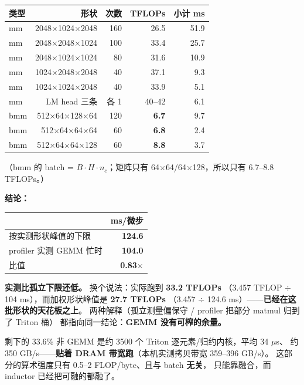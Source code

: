 \documentclass[11pt,openany]{ctexart}
\begin{document}
\begin{center}
\small
{}
\begin{tabular}{lrrrr}
\toprule
\textbf{类型} & \textbf{形状} & \textbf{次数} & \textbf{TFLOPs} & \textbf{小计 ms} \\
\midrule
mm & 2048$\times$1024$\times$2048 & 160 & 26.5 & 51.9 \\
mm & 2048$\times$2048$\times$1024 & 100 & 33.4 & 25.7 \\
mm & 2048$\times$1024$\times$1024 & 80 & 31.6 & 10.9 \\
mm & 1024$\times$2048$\times$2048 & 40 & 37.1 & 9.3 \\
mm & 1024$\times$1024$\times$2048 & 40 & 33.9 & 5.1 \\
mm & LM head 三条 & 各 1 & 40–42 & 6.1 \\
bmm & 512$\times$64$\times$128$\times$64 & 120 & \textbf{6.7} & 9.7 \\
bmm & 512$\times$64$\times$64$\times$64 & 60 & \textbf{6.8} & 2.4 \\
bmm & 512$\times$64$\times$64$\times$128 & 60 & \textbf{8.8} & 3.7 \\
\bottomrule
\end{tabular}
\end{center}

（bmm 的 batch = $B{\cdot}H{\cdot}n_c$；矩阵只有 64$\times$64/64$\times$128，所以只有 6.7–8.8 TFLOPs。）

\textbf{结论：}

\begin{center}
\small
{}
\begin{tabular}{lr}
\toprule
\textbf{} & \textbf{ms/微步} \\
\midrule
按实测形状峰值的下限 & \textbf{124.6} \\
profiler 实测 GEMM 忙时 & \textbf{104.0} \\
比值 & \textbf{0.83$\times$} \\
\bottomrule
\end{tabular}
\end{center}

\textbf{实测比孤立下限还低。} 换个说法：实际跑到 \textbf{33.2 TFLOPs} （3.457 TFLOP $\div$ 104 ms），而加权形状峰值是 \textbf{27.7 TFLOPs} （3.457 $\div$ 124.6 ms）——\textbf{已经在这批形状的天花板之上}。 两种解释（孤立测量偏保守 / profiler 把部分 matmul 归到了 Triton 桶） 都指向同一结论：\textbf{GEMM 没有可榨的余量。}

剩下的 33.6\% 非 GEMM 是约 3500 个 Triton 逐元素/归约内核，平均 34 $\mu$s、 约 350 GB/s——\textbf{贴着 DRAM 带宽跑}（本机实测拷贝带宽 359–396 GB/s）。 这部分的算术强度只有 0.5–2 FLOP/byte、且与 batch \textbf{无关}， 只能靠融合，而 inductor 已经把可融的都融了。
\end{document}
